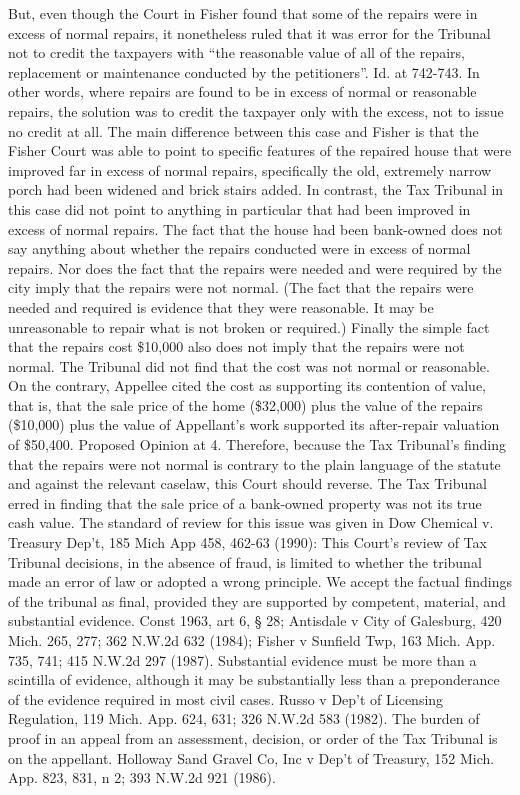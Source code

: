 \documentclass[12pt,\documentclassflag]{michiganCourtOfAppealsBrief}
\begin{document}
But, even though the Court in Fisher found that some of the repairs were in excess of normal repairs, it nonetheless ruled that it was error for the Tribunal not to credit the taxpayers with ``the reasonable value of all of the repairs, replacement or maintenance conducted by the petitioners''. Id. at 742-743. In other words, where repairs are found to be in excess of normal or reasonable repairs, the solution was to credit the taxpayer only with the excess, not to issue no credit at all.
The main difference between this case and Fisher is that the Fisher Court was able to point to specific features of the repaired house that were improved far in excess of normal repairs, specifically the old, extremely narrow porch had been widened and brick stairs added. In contrast, the Tax Tribunal in this case did not point to anything in particular that had been improved in excess of normal repairs. The fact that the house had been bank-owned does not say anything about whether the repairs conducted were in excess of normal repairs. Nor does the fact that the repairs were needed and were required by the city imply that the repairs were not normal. (The fact that the repairs were needed and required is evidence that they were reasonable. It may be unreasonable to repair what is not broken or required.) Finally the simple fact that the repairs cost \$10,000 also does not imply that the repairs were not normal. The Tribunal did not find that the cost was not normal or reasonable. On the contrary, Appellee cited the cost as supporting its contention of value, that is, that the sale price of the home (\$32,000) plus the value of the repairs (\$10,000) plus the value of Appellant's work supported its after-repair valuation of \$50,400. Proposed Opinion at 4. 
Therefore, because the Tax Tribunal's finding that the repairs were not normal is contrary to the plain language of the statute and against the relevant caselaw, this Court should reverse.
The Tax Tribunal erred in finding that the sale price of a bank-owned property was not its true cash value.
The standard of review for this issue was given in Dow Chemical v. Treasury Dep't, 185 Mich App 458, 462-63 (1990): 
This Court's review of Tax Tribunal decisions, in the absence of fraud, is limited to whether the tribunal made an error of law or adopted a wrong principle. We accept the factual findings of the tribunal as final, provided they are supported by competent, material, and substantial evidence. Const 1963, art 6, § 28; Antisdale v City of Galesburg, 420 Mich. 265, 277; 362 N.W.2d 632 (1984); Fisher v Sunfield Twp, 163 Mich. App. 735, 741; 415 N.W.2d 297 (1987). Substantial evidence must be more than a scintilla of evidence, although it may be substantially less than a preponderance of the evidence required in most civil cases. Russo v Dep't of Licensing Regulation, 119 Mich. App. 624, 631; 326 N.W.2d 583 (1982). The burden of proof in an appeal from an assessment, decision, or order of the Tax Tribunal is on the appellant. Holloway Sand Gravel Co, Inc v Dep't of Treasury, 152 Mich. App. 823, 831, n 2; 393 N.W.2d 921 (1986).
 
\end{document}
